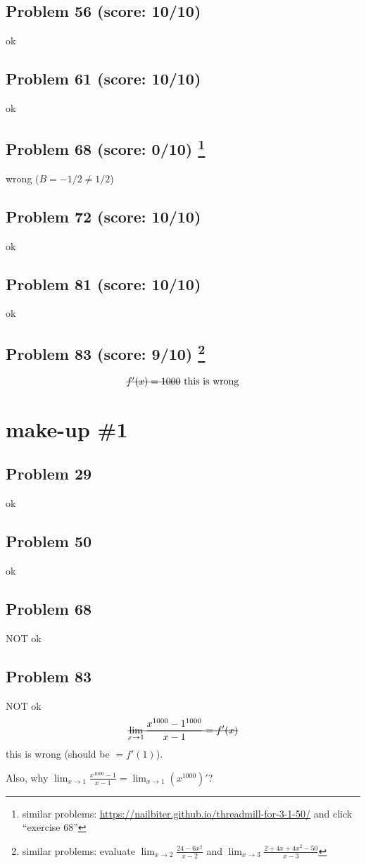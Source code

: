 \documentclass[10pt]{article} %
\begin{document}
\subsection*{Problem 56 (score: 10/10)}
ok
\subsection*{Problem 61 (score: 10/10)}
ok
\subsection*{Problem 68 (score: 0/10) \footnote{similar problems: \url{https://nailbiter.github.io/threadmill-for-3-1-50/} and click ``exercise 68''}}
wrong ($B=-1/2\neq1/2$)
\subsection*{Problem 72 (score: 10/10)}
ok
\subsection*{Problem 81 (score: 10/10)}
ok
\subsection*{Problem 83 (score: 9/10) \footnote{similar problems: evaluate $\lim_{x\to2}\frac{24-6x^2}{x-2}$ and 
$\lim_{x\to3}\frac{2+4x+4x^2-50}{x-3}$}}
\begin{equation*}
	\mbox{\sout{$f'(x)=1000$} this is wrong}
\end{equation*}
\section*{make-up \#1}
\subsection*{Problem 29}
ok
\subsection*{Problem 50}
ok
\subsection*{Problem 68}
NOT ok
\subsection*{Problem 83}
NOT ok
\begin{equation*}
  \mbox{\sout{$\displaystyle\lim_{x\to1}\frac{x^{1000}-1^{1000}}{x-1}=f'(x)$}}  
\end{equation*}
this is wrong (should be $=f'(1)$).

Also, why $\lim_{x\to1}\frac{x^{1000}-1}{x-1}=\lim_{x\to1}\left( x^{1000} \right)'$?
\end{document}
